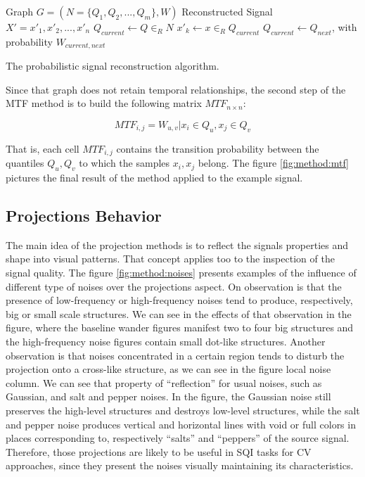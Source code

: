 \begin{algorithm}
	\begin{algorithmic}
		\Require Graph $G=(N=\{Q_1, Q_2, ..., Q_m\},W)$
		\Ensure Reconstructed Signal $X'=x'_1,x'_2,...,x'_n$
		\State $Q_{current} \gets Q \in_R N$ 
			\State $x'_k \gets x \in_R Q_{current}$
			\State $Q_{current} \gets Q_{next}$, with probability $W_{current,next}$
		\EndFor
	\end{algorithmic}
	\caption{The probabilistic signal reconstruction algorithm. }
	\label{alg:mtf_reconstruction}
\end{algorithm}

Since that graph does not retain temporal relationships, the second step of the \gls{MTF} method is to build the following matrix $MTF_{n \times n}$: 

\begin{equation}
	MTF_{i,j} = W_{u,v} | x_i \in Q_u, x_j \in Q_v
\end{equation}

\noindent That is, each cell $MTF_{i,j}$ contains the transition probability between the quantiles $Q_u,Q_v$ to which the samples $x_i,x_j$ belong. The figure \ref{fig:method:mtf} pictures the final result of the method applied to the example signal. 



\subsection{Projections Behavior}

The main idea of the projection methods is to reflect the signals properties and shape into visual patterns. That concept applies too to the inspection of the signal quality. The figure \ref{fig:method:noises} presents examples of the influence of different type of noises over the projections aspect. On observation is that the presence of low-frequency or high-frequency noises tend to produce, respectively, big or small scale structures. We can see in the effects of that observation in the figure, where the baseline wander figures manifest two to four big structures and the high-frequency noise figures contain small dot-like structures. Another observation is that noises concentrated in a certain region tends to disturb the projection onto a cross-like structure, as we can see in the figure local noise column. We can see that property of ``reflection'' for usual noises, such as Gaussian, and salt and pepper noises. In the figure, the Gaussian noise still preserves the high-level structures and destroys low-level structures, while the salt and pepper noise produces vertical and horizontal lines with void or full colors in places corresponding to, respectively ``salts'' and ``peppers'' of the source signal. Therefore, those projections are likely to be useful in \gls{SQI} tasks for \gls{CV} approaches, since they present the noises visually maintaining its characteristics.  

